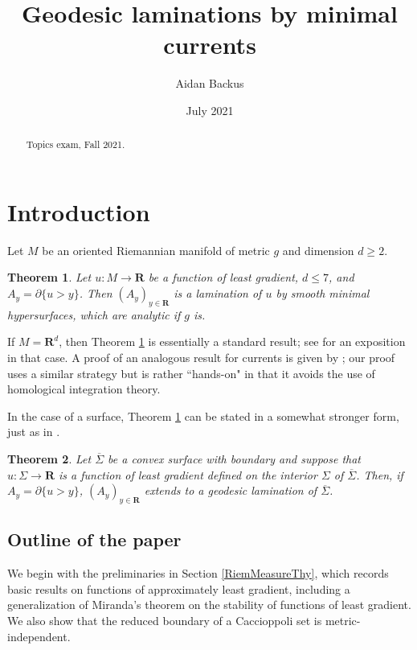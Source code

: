 \documentclass[reqno,12pt,letterpaper]{amsart}
\title[Geodesic laminations by minimal currents]{Geodesic laminations by minimal currents}
\author{Aidan Backus}
\date{July 2021}
\newcommand{\RR}{\mathbf{R}}
\newtheorem{theorem}{Theorem}[section]
\theoremstyle{definition}
\numberwithin{equation}{section}
\begin{document}
\begin{abstract}
Topics exam, Fall 2021.
\end{abstract}

\maketitle



\section{Introduction}
Let $M$ be an oriented Riemannian manifold of metric $g$ and dimension $d \geq 2$.

\begin{theorem}\label{main thm}
Let $u: M \to \RR$ be a function of least gradient, $d \leq 7$, and $A_y = \partial \{u > y\}$.
Then $(A_y)_{y \in \RR}$ is a lamination of $u$ by smooth minimal hypersurfaces, which are analytic if $g$ is.
\end{theorem}

If $M = \RR^d$, then Theorem \ref{main thm} is essentially a standard result; see \cite[Proposition 3.4]{górny2017planar} for an exposition in that case.
A proof of an analogous result for currents is given by \cite[\S5.3]{federer2014geometric}; our proof uses a similar strategy but is rather ``hands-on" in that it avoids the use of homological integration theory.

In the case of a surface, Theorem \ref{main thm} can be stated in a somewhat stronger form, just as in \cite[Corollary 3.5]{górny2017planar}.

\begin{theorem}\label{main crly}
Let $\overline \Sigma$ be a convex surface with boundary and suppose that $u: \Sigma \to \RR$ is a function of least gradient defined on the interior $\Sigma$ of $\overline \Sigma$.
Then, if $A_y = \partial \{u > y\}$, $(A_y)_{y \in \RR}$ extends to a geodesic lamination of $\overline \Sigma$.
\end{theorem}





\subsection{Outline of the paper}
We begin with the preliminaries in Section \ref{RiemMeasureThy}, which records basic results on functions of approximately least gradient, including a generalization of Miranda's theorem \cite[Teorema 3]{Miranda67} on the stability of functions of least gradient.
We also show that the reduced boundary of a Caccioppoli set is metric-independent.
\end{document}
